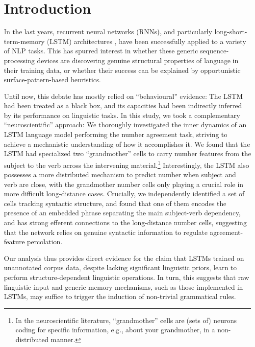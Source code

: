 \section{Introduction}

In the last years, recurrent neural networks (RNNs), and particularly
long-short-term-memory (LSTM) architectures
\cite{Hochreiter:Schmidhuber:1997}, have been successfully applied to
a variety of NLP tasks. This has spurred interest in whether these
generic sequence-processing devices are discovering genuine structural
properties of language in their training data, or whether their
success can be explained by opportunistic surface-pattern-based
heuristics.

Until now, this debate has mostly relied on ``behavioural'' evidence:
The LSTM had been treated as a black box, and its capacities had been indirectly
inferred by its performance on linguistic tasks. In this study, we took a
complementary ``neuroscientific'' approach: We thoroughly investigated
the inner dynamics of an LSTM language model performing the number agreement task,
striving to achieve a mechanistic understanding of how it accomplishes
it. We found that the LSTM had specialized two ``grandmother'' cells
\cite{Bowers:2009} to carry number features from the subject to the
verb across the intervening material.\footnote{In the neuroscientific
  literature, ``grandmother'' cells are (sets of) neurons coding for
  specific information, e.g., about your grandmother, in a
  non-distributed manner.} Interestingly, the LSTM also
possesses a more distributed mechanism to predict number when subject
and verb are close, with the grandmother number cells only playing a
crucial role in more difficult long-distance cases. Crucially, we
independently identified a set of cells tracking syntactic structure,
and found that one of them encodes the presence of an embedded phrase
separating the main subject-verb dependency, and has strong efferent
connections to the long-distance number cells, suggesting that the
network relies on genuine syntactic information to regulate
agreement-feature percolation.

Our analysis thus provides direct evidence for the claim that LSTMs
trained on unannotated corpus data, despite
lacking significant linguistic priors, learn to perform
structure-dependent linguistic operations. In turn, this suggests that
raw linguistic input and generic memory mechanisms, such as those
implemented in LSTMs, may suffice to trigger the induction of
non-trivial grammatical rules.
